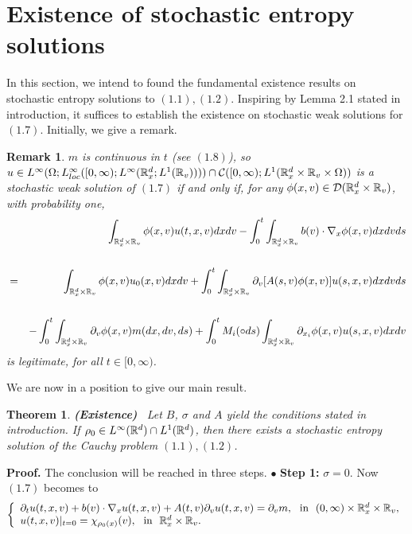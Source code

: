\documentclass[11pt]{article}
\newtheorem{theorem}{Theorem}[section]
\newtheorem{remark}{Remark}[section]
\begin{document}
\section{Existence of stochastic entropy solutions}\label{sec3}
\setcounter{equation}{0}  In this section, we intend to found the
fundamental existence results on stochastic entropy solutions to
$(1.1), (1.2)$. Inspiring by Lemma 2.1 stated in introduction, it
suffices to establish the existence on stochastic weak solutions for
$(1.7)$. Initially, we give a remark.
\begin{remark}
$m$ is continuous in $t$ (see $(1.8)$), so $u\in
L^\infty(\Omega;L^\infty_{loc}([0,\infty);L^\infty(
{\mathbb R}^d_x;L^1({\mathbb R}_v))))\cap{\mathcal C}([0,\infty);L^1({{\mathbb R}}^d_x\times
{\mathbb R}_v\times \Omega))$ is a stochastic weak solution of $(1.7)$ if
and only if, for any $\phi(x,v)\in {\mathcal D}({\mathbb R}^d_x\times{\mathbb R}_v)$, with
probability one,
\begin{eqnarray*}
&&\int_{{\mathbb R}^d_x\times{\mathbb R}_v}\phi(x,v)u(t,x,v)dxdv
-\int^t_0\int_{{\mathbb R}^d_x\times{\mathbb R}_v}b(v)\cdot\nabla_x\phi(x,v)dxdvds
 \cr \cr &=& \int_{{\mathbb R}^d_x\times{\mathbb R}_v}\phi(x,v)u_0(x,v)dxdv
+\int^t_0\int_{{\mathbb R}^d_x\times{\mathbb R}_v}\partial_v[A(s,v)\phi(x,v)]u(s,x,v)dxdvds
\cr\cr&& - \int^t_0\int_{{\mathbb R}^d_x\times{\mathbb R}_v}\partial_v\phi(x,v)
m(dx,dv,ds) +\int^t_0M_i(\circ
ds)\int_{{\mathbb R}^d_x\times{\mathbb R}_v}\partial_{x_i}\phi(x,v)u(s,x,v)dxdv
\end{eqnarray*}
is legitimate, for all $t\in [0,\infty)$.
\end{remark}
   \vskip0mm\par
 We are now in a position to give our main result.
\begin{theorem} \textbf{(Existence)} \ Let $B$, $\sigma$ and $A$
yield the conditions stated in introduction. If $\rho_0\in
L^\infty({\mathbb R}^d)\cap L^1({\mathbb R}^d)$, then there exists a stochastic
entropy solution of the Cauchy problem $(1.1), (1.2)$.
 \end{theorem}
\textbf{Proof.} The conclusion will be reached in three steps.
  \vskip2mm\noindent
$\bullet$ \textbf{Step 1:} $\sigma=0$. Now $(1.7)$ becomes to
\begin{eqnarray}\label{3.1}
\left\{\begin{array}{ll}\partial_tu(t,x,v)+b(v)\cdot\nabla_xu(t,x,v)+
A(t,v)\partial_vu(t,x,v)
=\partial_vm, \ \ \mbox{in} \ \ (0,\infty)\times {\mathbb R}^d_x\times {\mathbb R}_v, \\
u(t,x,v)|_{t=0}=\chi_{\rho_0(x)}(v),  \ \ \mbox{in} \ \
{\mathbb R}^d_x\times {\mathbb R}_v.
  \end{array}
\right.
\end{eqnarray}
\end{document}
